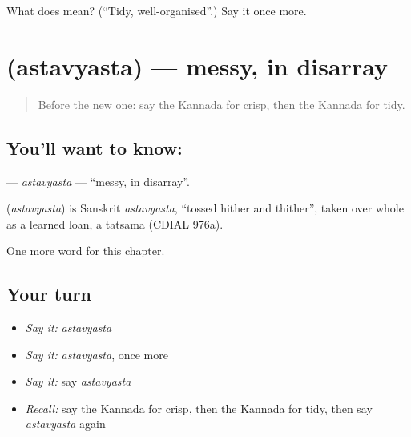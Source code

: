 \begin{tcolorbox}[breakable,colback=teal!4,colframe=teal!35!black,title={Before you move on}]
What does  mean? (\textquotedblleft{}Tidy, well-organised\textquotedblright{}.) Say it once more.
\end{tcolorbox}
\section[\texorpdfstring{\kn{ಅಸ್ತವ್ಯಸ್ತ} (astavyasta)}{ಅಸ್ತವ್ಯಸ್ತ (astavyasta)}]{ (astavyasta) — messy, in disarray}

\label{lesson:KA-C292-astavyasta}



\begin{quote}
Before the new one: say the Kannada for crisp, then the Kannada for tidy.
\end{quote}

\subsection*{You'll want to know: }
\textbf{} — \emph{astavyasta} — \textquotedblleft{}messy, in disarray\textquotedblright{}.

\begin{cousinweb}
\textbf{} (\emph{astavyasta}) is Sanskrit \emph{astavyasta}, \textquotedblleft{}tossed hither and thither\textquotedblright{}, taken over whole as a learned loan, a tatsama (CDIAL 976a).
\end{cousinweb}

\begin{grammarlens}[title={What you've built}]
One more word for this chapter.
\end{grammarlens}

\subsection*{Your turn}
\begin{itemize}
\raggedright
  \item \emph{Say it:} \emph{astavyasta}
  \item \emph{Say it:} \emph{astavyasta}, once more
  \item \emph{Say it:} say \emph{astavyasta}
  \item \emph{Recall:} say the Kannada for crisp, then the Kannada for tidy, then say \emph{astavyasta} again
\end{itemize}

